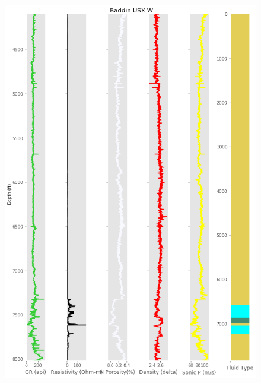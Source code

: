 \documentclass[11pt, a4paper]{article}
\begin{document}
\begin{figure}[h!]
  \includegraphics[width=\linewidth]{w1}
\end{figure}
\end{document}

